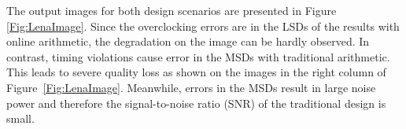\documentclass{acm_proc_article-sp}
\begin{document}
The output images for both design scenarios are presented in Figure \ref{Fig:LenaImage}. Since the overclocking errors are in the LSDs of the results with online arithmetic, the degradation on the image can be hardly observed. In contrast, timing violations cause error in the MSDs with traditional arithmetic. This leads to severe quality loss as shown on the images in the right column of Figure~\ref{Fig:LenaImage}. Meanwhile, errors in the MSDs result in large noise power and therefore the signal-to-noise ratio (SNR) of the traditional design is small.\vspace{-1ex}

\begin{figure}[htb]
  \vspace{-2.5ex}
  \centering
  \vspace{-1ex}
\end{figure}
\end{document}
